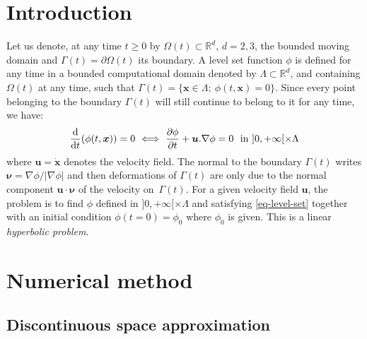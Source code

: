 \documentclass[notitlepage,a4paper,fleqn,9pt]{icmfarticle}
\newcommand{\Frac}[2] {\displaystyle \frac{#1}{#2}}
\renewcommand{\geq}{\geqslant}
\begin{document}
\begin{multicols}{2}
\section{Introduction}
Let us denote, at any time $t\geq 0$
by $\Omega(t)\subset\mathbb{R}^d$, $d=2,3$, the bounded moving domain and
$\Gamma(t)=\partial\Omega(t)$ its boundary.
A level set function $\phi$ is defined for any time
in a bounded computational domain denoted by $\Lambda\subset\mathbb{R}^d$,
and containing $\Omega(t)$ at any time,
such that
\mbox{$
  \Gamma(t) = \{ \boldsymbol{x}\in\Lambda ; \ \phi(t,\boldsymbol{x})=0 \}
$}.
Since every point belonging to the boundary $\Gamma(t)$ will still
continue to belong to it for any time, we have:
\begin{eqnarray}
    \Frac{{\rm d}}{{\rm d}t} (\phi(t,\boldsymbol{x})) = 0
    \ \Longleftrightarrow \ 
    \Frac{\partial\phi}{\partial t} + \boldsymbol{u}.\nabla\phi = 0
    \ \mbox{ in } ]0,+\infty[\times \Lambda 
    \label{eq-level-set}
\end{eqnarray}
where 
$\boldsymbol{u}=\dot{\boldsymbol{x}}$ denotes the velocity field.
The normal to the boundary $\Gamma(t)$ writes
\mbox{$
    \boldsymbol{\nu}
    =
    \nabla\phi/|\nabla\phi|
$}
and then deformations of $\Gamma(t)$ are only due
to the normal component $\boldsymbol{u}\cdot\boldsymbol{\nu}$
of the velocity on~$\Gamma(t)$.
For a given velocity field $\boldsymbol{u}$,
the problem is to find $\phi$ defined in 
$]0,+\infty[\times \Lambda$ and satisfying \eqref{eq-level-set}
together with an initial condition $\phi(t\!=\!0)=\phi_0$
where $\phi_0$ is given.
This is a linear \emph{hyperbolic problem}.
\section{Numerical method} 
\subsection{Discontinuous space approximation} 

\end{multicols}
\end{document}
